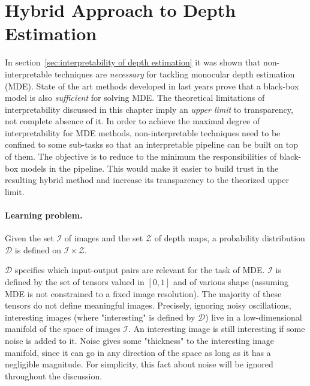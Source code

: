 \section{Hybrid Approach to Depth Estimation}
\label{sec:hybrid}
In section~\ref{sec:interpretability of depth estimation} it was shown that non-interpretable techniques are \textit{necessary} for tackling monocular depth estimation (MDE).
State of the art methods developed in last years prove that a black-box model is also \textit{sufficient} for solving MDE.
The theoretical limitations of interpretability discussed in this chapter imply an \textit{upper limit} to transparency, not complete absence of it.
In order to achieve the maximal degree of interpretability for MDE methods, non-interpretable techniques need to be confined to some sub-tasks so that an interpretable pipeline can be built on top of them.
The objective is to reduce to the minimum the responsibilities of black-box models in the pipeline.
This would make it easier to build trust in the resulting hybrid method and increase its transparency to the theorized upper limit.

\vspace{0.5cm}

\paragraph{Learning problem.}
Given the set $\mathcal{I}$ of images and the set $\mathcal{Z}$ of depth maps, a probability distribution $\mathcal{D}$ is defined on $\mathcal{I} \times \mathcal{Z}$.

$\mathcal{D}$ specifies which input-output pairs are relevant for the task of MDE.
$\mathcal{I}$ is defined by the set of tensors valued in $[0, 1]$ and of various shape (assuming MDE is not constrained to a fixed image resolution).
The majority of these tensors do not define meaningful images.
Precisely, ignoring noisy oscillations, interesting images (where "interesting" is defined by $\mathcal{D}$) live in a low-dimensional manifold of the space of images $\mathcal{I}$.
An interesting image is still interesting if some noise is added to it.
Noise gives some "thickness" to the interesting image manifold, since it can go in any direction of the space as long as it has a negligible magnitude.
For simplicity, this fact about noise will be ignored throughout the discussion.

